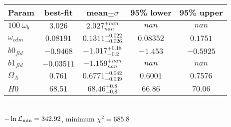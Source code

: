 \begin{tabular}{|l|c|c|c|c|} 
 \hline 
Param & best-fit & mean$\pm\sigma$ & 95\% lower & 95\% upper \\ \hline 
$100~\omega_{b }$ &$3.026$ & $2.027_{nan}^{+nan}$ & $nan$ & $nan$ \\ 
$\omega_{cdm }$ &$0.08191$ & $0.1311_{-0.026}^{+0.022}$ & $0.08352$ & $0.1751$ \\ 
$b0_{fld }$ &$-0.9468$ & $-1.017_{-0.2}^{+0.18}$ & $-1.453$ & $-0.5925$ \\ 
$b1_{fld }$ &$-0.03511$ & $-1.159_{nan}^{+nan}$ & $nan$ & $nan$ \\ 
$\Omega_{\Lambda }$ &$0.761$ & $0.6771_{-0.039}^{+0.042}$ & $0.6001$ & $0.7576$ \\ 
$H0$ &$68.51$ & $68.46_{-0.8}^{+0.8}$ & $66.86$ & $70.06$ \\ 
\hline 
 \end{tabular} \\ 
$-\ln{\cal L}_\mathrm{min} =342.92$, minimum $\chi^2=685.8$ \\ 

